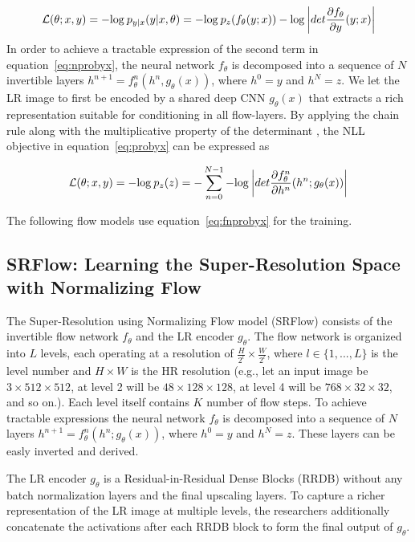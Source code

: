 \documentclass{article}
\begin{document}
\begin{equation}
    \label{eq:nprobyx}
    \mathcal{L}(\theta; x,y) = -\textnormal{log} \: p_{y|x}(y|x,\theta) = -\textnormal{log} \: p_z (f_{\theta}(y;x))  -\textnormal{log} \: \bigg | det \frac{\partial f_{\theta}}{\partial y}(y;x) \bigg |
\end{equation}
In order to achieve a tractable expression of the second term in equation~\ref{eq:nprobyx}, the neural network $f_\theta$ is decomposed into a sequence of $N$ invertible layers $h^{n+1}= f^n_\theta(h^n, g_\theta(x))$, where $h^0 = y$ and $h^N = z$. We let the LR image to first be encoded by a shared deep CNN $g_{\theta}(x)$ that extracts a rich representation suitable for conditioning in all flow-layers. By applying the chain rule along with the multiplicative property of the determinant \cite{dens}, the NLL objective in equation~\ref{eq:probyx} can be expressed as

\begin{equation}
    \label{eq:fnprobyx}
    \mathcal{L}(\theta; x,y) = -\textnormal{log} \: p_{z}(z) = -\sum^{N-1}_{n=0}   -\textnormal{log} \: \bigg | det \frac{\partial f_{\theta}^n}{\partial h^n}(h^n;g_\theta(x)) \bigg |
\end{equation}

\noindent The following flow models use equation~\ref{eq:fnprobyx} for the training.


\subsection{SRFlow: Learning the Super-Resolution Space with Normalizing Flow}
The Super-Resolution using Normalizing Flow model (SRFlow) \cite{srFlow} consists of the invertible flow network $f_{\theta}$ and the LR encoder $g_{\theta}$. The flow network is organized into $L$ levels, each operating at a resolution of $\frac{H}{2^l}\times\frac{W}{2^l}$, where $l \in \{1, ..., L\}$ is the level number and $H\times W$ is the HR resolution (e.g., let an input image be $3\times 512 \times 512$, at level 2 will be $48 \times 128 \times 128$, at level 4 will be $768 \times 32 \times 32$, and so on.). Each level itself contains $K$ number of flow steps. To achieve tractable expressions the neural network $f_\theta$ is decomposed into a sequence of $N$ layers $h^{n+1} = f_\theta ^n (h^n; g_\theta(x))$, where $h^0 = y$ and $h^N = z$. These layers can be easly inverted and derived.

The LR encoder $g_{\theta}$ is a Residual-in-Residual Dense Blocks (RRDB) \cite{rrdb} without any batch normalization layers and the final upscaling layers. To capture a richer representation of the LR image at multiple levels, the researchers additionally concatenate the activations after each RRDB block to form the final output of $g_\theta$.
\end{document}
